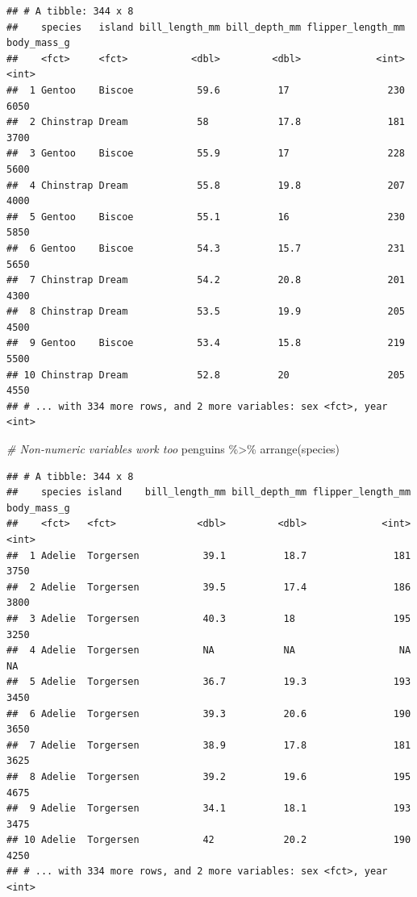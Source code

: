 \documentclass[
]{article}
\newenvironment{Shaded}{\begin{snugshade}}{\end{snugshade}}
\newcommand{\CommentTok}[1]{\textcolor[rgb]{0.56,0.35,0.01}{\textit{#1}}}
\newcommand{\FunctionTok}[1]{\textcolor[rgb]{0.00,0.00,0.00}{#1}}
\newcommand{\NormalTok}[1]{#1}
\newcommand{\SpecialCharTok}[1]{\textcolor[rgb]{0.00,0.00,0.00}{#1}}
\begin{document}
\begin{verbatim}
## # A tibble: 344 x 8
##    species   island bill_length_mm bill_depth_mm flipper_length_mm body_mass_g
##    <fct>     <fct>           <dbl>         <dbl>             <int>       <int>
##  1 Gentoo    Biscoe           59.6          17                 230        6050
##  2 Chinstrap Dream            58            17.8               181        3700
##  3 Gentoo    Biscoe           55.9          17                 228        5600
##  4 Chinstrap Dream            55.8          19.8               207        4000
##  5 Gentoo    Biscoe           55.1          16                 230        5850
##  6 Gentoo    Biscoe           54.3          15.7               231        5650
##  7 Chinstrap Dream            54.2          20.8               201        4300
##  8 Chinstrap Dream            53.5          19.9               205        4500
##  9 Gentoo    Biscoe           53.4          15.8               219        5500
## 10 Chinstrap Dream            52.8          20                 205        4550
## # ... with 334 more rows, and 2 more variables: sex <fct>, year <int>
\end{verbatim}

\begin{Shaded}
\begin{Highlighting}[]
\CommentTok{\# Non{-}numeric variables work too}
\NormalTok{penguins }\SpecialCharTok{\%\textgreater{}\%} 
  \FunctionTok{arrange}\NormalTok{(species)}
\end{Highlighting}
\end{Shaded}

\begin{verbatim}
## # A tibble: 344 x 8
##    species island    bill_length_mm bill_depth_mm flipper_length_mm body_mass_g
##    <fct>   <fct>              <dbl>         <dbl>             <int>       <int>
##  1 Adelie  Torgersen           39.1          18.7               181        3750
##  2 Adelie  Torgersen           39.5          17.4               186        3800
##  3 Adelie  Torgersen           40.3          18                 195        3250
##  4 Adelie  Torgersen           NA            NA                  NA          NA
##  5 Adelie  Torgersen           36.7          19.3               193        3450
##  6 Adelie  Torgersen           39.3          20.6               190        3650
##  7 Adelie  Torgersen           38.9          17.8               181        3625
##  8 Adelie  Torgersen           39.2          19.6               195        4675
##  9 Adelie  Torgersen           34.1          18.1               193        3475
## 10 Adelie  Torgersen           42            20.2               190        4250
## # ... with 334 more rows, and 2 more variables: sex <fct>, year <int>
\end{verbatim}
\end{document}
